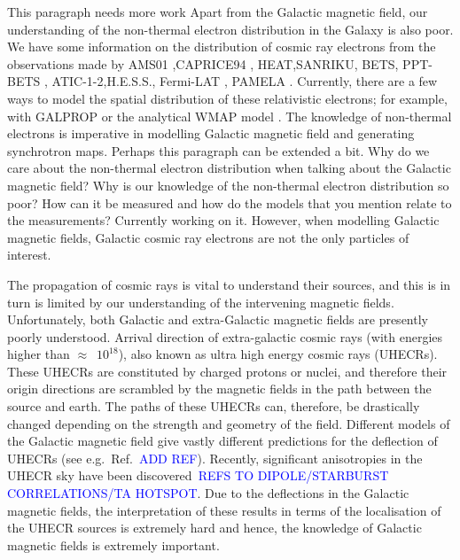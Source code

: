 \documentclass[12pt, a4 paper]{mnras}
\newcommand{\Arjen}[1]{{\color{brown}#1}}
\newcommand{\Vasu}[1]{{\color{purple}#1}}
\begin{document}
\Vasu{This paragraph needs more work}
Apart from the Galactic magnetic field, our understanding of the non-thermal electron distribution in the Galaxy is also poor. We have some information on the distribution of cosmic ray electrons from the observations made by AMS01 \cite{AMS_2002},CAPRICE94 \cite{CAPRICE_2001} , HEAT\cite{Heat_2001},SANRIKU\cite{Sanriku_1999}, BETS\cite{Bets_2001}, PPT-BETS\cite{PPT_BETS} , ATIC-1-2\cite{AITC_1_2},H.E.S.S.\cite{HESS_2008}\cite{HESS_2009}, Fermi-LAT \cite{FERMI_2009}\cite{FERMI_2010}, PAMELA \cite{Pamela}. Currently, there are a few ways to model the spatial distribution of these relativistic electrons; for example, with GALPROP \cite{Hammurabi} \cite{Orlando_2011} or the analytical WMAP model \cite{WMAP_Page}. The knowledge of non-thermal electrons is imperative in modelling Galactic magnetic field and generating synchrotron maps.  \Arjen{Perhaps this paragraph can be extended a bit. Why do we care about the non-thermal electron distribution when talking about the Galactic magnetic field? Why is our knowledge of the non-thermal electron distribution so poor? How can it be measured and how do the models that you mention relate to the measurements?} \Vasu{Currently working on it.}
However, when modelling Galactic magnetic fields, Galactic cosmic ray electrons are not the only particles of interest. 

The propagation of cosmic rays is vital to understand their sources, and this is in turn is limited by our understanding of the intervening magnetic fields. Unfortunately, both Galactic and extra-Galactic magnetic fields are presently poorly understood. Arrival direction of extra-galactic cosmic rays (with energies higher than $\approx$~$10^{18}$), also known  as ultra high energy cosmic rays (UHECRs). These UHECRs are constituted by charged protons or nuclei, and therefore their origin directions are scrambled by the magnetic fields in the path between the source and earth. The paths of these UHECRs can, therefore, be drastically changed depending on the strength and geometry of the field. Different models of the Galactic magnetic field give vastly different predictions for the deflection of UHECRs (see e.g.~Ref.~\textcolor{blue}{ADD REF}). Recently, significant anisotropies in the UHECR sky have been discovered~\textcolor{blue}{REFS TO DIPOLE/STARBURST CORRELATIONS/TA HOTSPOT}. Due to the deflections in the Galactic magnetic fields, the interpretation of these results in terms of the localisation of the UHECR sources is extremely hard and hence, the knowledge of Galactic magnetic fields is extremely important. 
\end{document}
